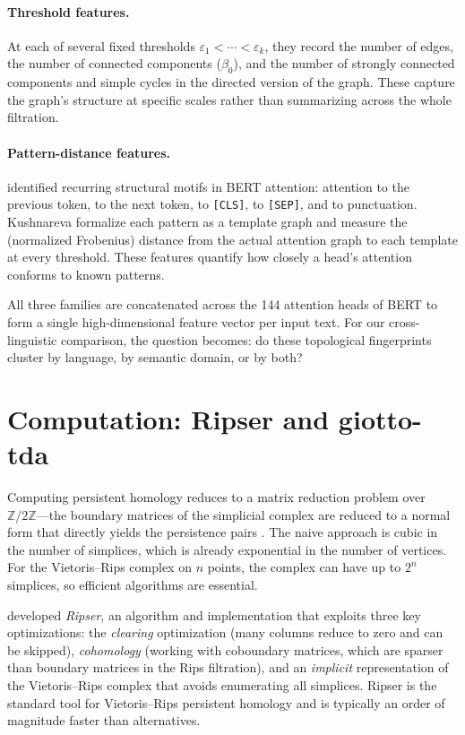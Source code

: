 \paragraph{Threshold features.}
At each of several fixed thresholds $\varepsilon_1 < \cdots <
\varepsilon_k$, they record the number of edges, the number of connected
components ($\beta_0$), and the number of strongly connected components
and simple cycles in the directed version of the graph.
These capture the graph's structure at specific scales rather than
summarizing across the whole filtration.

\paragraph{Pattern-distance features.}
\textcite{clark2019} identified recurring structural motifs in BERT
attention: attention to the previous token, to the next token, to
\texttt{[CLS]}, to \texttt{[SEP]}, and to punctuation.
Kushnareva formalize each pattern as a template graph and measure the
(normalized Frobenius) distance from the actual attention graph to each
template at every threshold.
These features quantify how closely a head's attention conforms to known
patterns.

All three families are concatenated across the 144 attention heads of
BERT to form a single high-dimensional feature vector per input text.
For our cross-linguistic comparison, the question becomes: do these
topological fingerprints cluster by language, by semantic domain, or by
both?


\section{Computation: Ripser and giotto-tda}
\label{sec:computation}

Computing persistent homology reduces to a matrix reduction problem
over $\mathbb{Z}/2\mathbb{Z}$---the boundary matrices of the simplicial
complex are reduced to a normal form that directly yields the
persistence pairs \parencite{zomorodian2005}.
The naive approach is cubic in the number of simplices, which is already
exponential in the number of vertices.
For the Vietoris--Rips complex on $n$ points, the complex can have up to
$2^n$ simplices, so efficient algorithms are essential.

\textcite{bauer2021} developed \emph{Ripser}, an algorithm and
implementation that exploits three key optimizations:
the \emph{clearing} optimization (many columns reduce to zero and can be
skipped), \emph{cohomology} (working with coboundary matrices, which are
sparser than boundary matrices in the Rips filtration), and an
\emph{implicit} representation of the Vietoris--Rips complex that avoids
enumerating all simplices.
Ripser is the standard tool for Vietoris--Rips persistent homology
and is typically an order of magnitude faster than alternatives.

